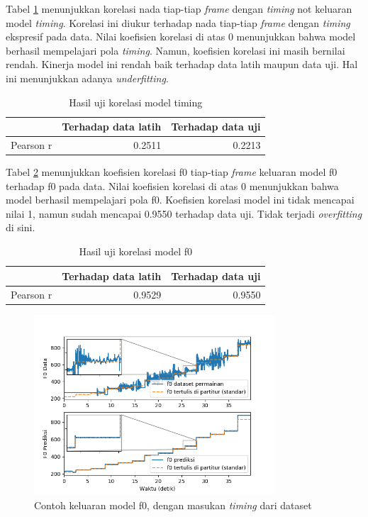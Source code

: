 Tabel \ref{tab-timing-testing-results} menunjukkan korelasi nada tiap-tiap \textit{frame} dengan \textit{timing} not keluaran model \textit{timing}. Korelasi ini diukur terhadap nada tiap-tiap \textit{frame} dengan \textit{timing} ekspresif pada data. Nilai koefisien korelasi di atas 0 menunjukkan bahwa model berhasil mempelajari pola \textit{timing}. Namun, koefisien korelasi ini masih bernilai rendah. Kinerja model ini rendah baik terhadap data latih maupun data uji. Hal ini menunjukkan adanya \textit{underfitting}.

\begin{table}[htbp]
    \centering
    \caption{Hasil uji korelasi model timing}\label{tab-timing-testing-results}
    \begin{tabular}{ |l|r|r| } 
     \cline{2-3}
     \multicolumn{1}{l|}{}&Terhadap data latih&Terhadap data uji\\\hline
	 Pearson r&0.2511  &0.2213\\\hline
    \end{tabular}
\end{table}

Tabel \ref{tab-f0-testing-results} menunjukkan koefisien korelasi f0 tiap-tiap \textit{frame} keluaran model f0 terhadap f0 pada data. Nilai koefisien korelasi di atas 0 menunjukkan bahwa model berhasil mempelajari pola f0. Koefisien korelasi model ini tidak mencapai nilai 1, namun sudah mencapai 0.9550 terhadap data uji. Tidak terjadi \textit{overfitting} di sini.
\begin{table}[htbp]
    \centering
    \caption{Hasil uji korelasi model f0}\label{tab-f0-testing-results}
    \begin{tabular}{ |l|r|r| } 
     \cline{2-3}
     \multicolumn{1}{l|}{}&Terhadap data latih&Terhadap data uji\\\hline
	 Pearson r&0.9529  &0.9550\\\hline
    \end{tabular}
\end{table}

\begin{figure}[h]
    \centering
    \includegraphics[width=0.8\textwidth]{resources/Analisis_F0.png}
    \caption{Contoh keluaran model f0, dengan masukan \textit{timing} dari dataset}\label{fig-f0-output-sample}
\end{figure}

